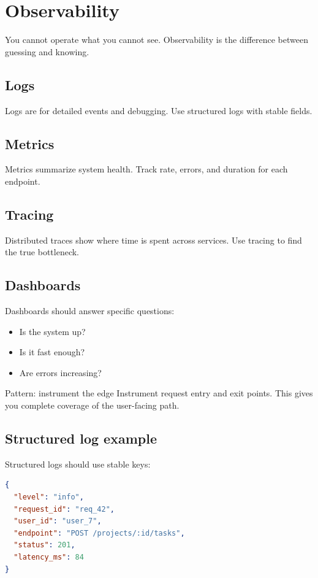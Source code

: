 \chapter{Observability}

You cannot operate what you cannot see.
Observability is the difference between guessing and knowing.

\section{Logs}
Logs are for detailed events and debugging.
Use structured logs with stable fields.

\section{Metrics}
Metrics summarize system health.
Track rate, errors, and duration for each endpoint.

\section{Tracing}
Distributed traces show where time is spent across services.
Use tracing to find the true bottleneck.

\section{Dashboards}
Dashboards should answer specific questions:
\begin{itemize}[nosep]
  \item Is the system up?
  \item Is it fast enough?
  \item Are errors increasing?
\end{itemize}

\begin{patternbox}{Pattern: instrument the edge}
Instrument request entry and exit points.
This gives you complete coverage of the user-facing path.
\end{patternbox}

\section{Structured log example}
Structured logs should use stable keys:
\begin{lstlisting}[language=JSON]
{
  "level": "info",
  "request_id": "req_42",
  "user_id": "user_7",
  "endpoint": "POST /projects/:id/tasks",
  "status": 201,
  "latency_ms": 84
}
\end{lstlisting}

